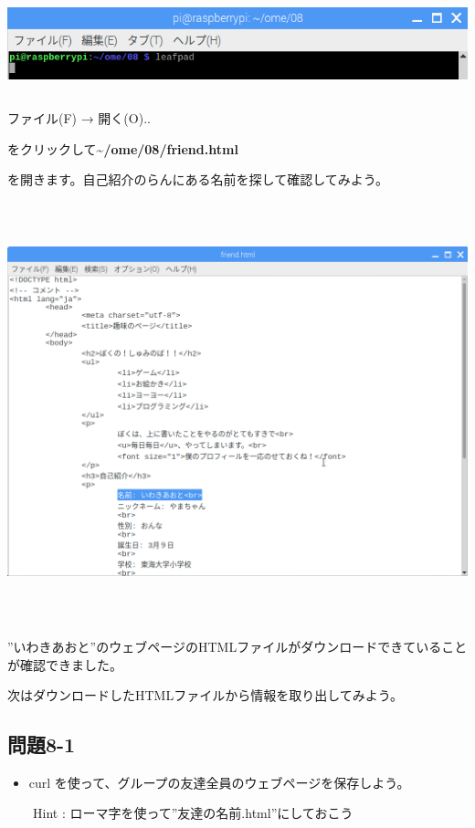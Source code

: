 \documentclass[a4paper,12pt,dvipdfmx]{jarticle}
\begin{document}
\begin{center}
\includegraphics[width=17.006cm,height=2.87cm]{textbook-img006.png}

\end{center}
ファイル(F) → 開く(O).. 

をクリックして\textbf{\~{}/ome/08/friend.html}

を開きます。自己紹介のらんにある名前を探して確認してみよう。



\begin{center}
\includegraphics[width=17.006cm,height=12.157cm]{textbook-img007.png}

\end{center}

\bigskip

”いわきあおと”のウェブページのHTMLファイルがダウンロードできていることが確認できました。

次はダウンロードしたHTMLファイルから情報を取り出してみよう。

\clearpage\subsection*{問題8-1}
\begin{itemize}
\item curl
を使って、グループの友達全員のウェブページを保存しよう。
\end{itemize}
\ \ \ \ Hint :
ローマ字を使って”友達の名前.html”にしておこう
\end{document}
